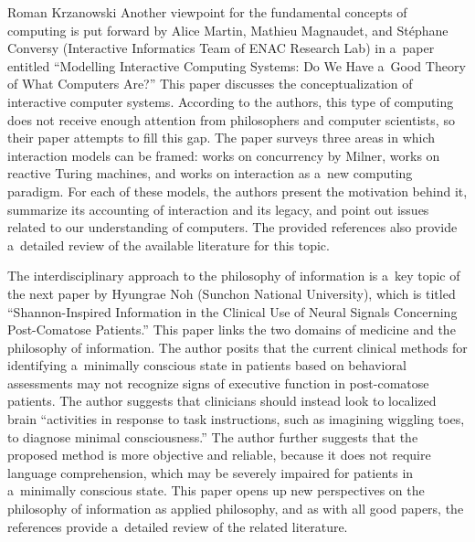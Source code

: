 \begin{editorialeng}{Roman Krzanowski}
Another viewpoint for the fundamental concepts of computing is put forward by Alice Martin, Mathieu Magnaudet, and Stéphane Conversy (Interactive Informatics Team of ENAC Research Lab) in a~paper entitled ``Modelling Interactive Computing Systems: Do We Have a~Good Theory of What Computers Are?'' This paper discusses the conceptualization of interactive computer systems. According to the authors, this type of computing does not receive enough attention from philosophers and computer scientists, so their paper attempts to fill this gap. The paper surveys three areas in which interaction models can be framed: works on concurrency by Milner, works on reactive Turing machines, and works on interaction as a~new computing paradigm. For each of these models, the authors present the motivation behind it, summarize its accounting of interaction and its legacy, and point out issues related to our understanding of computers. The provided references also provide a~detailed review of the available literature for this topic.

The interdisciplinary approach to the philosophy of information is a~key topic of the next paper by Hyungrae Noh (Sunchon National University), which is titled ``Shannon-Inspired Information in the Clinical Use of Neural Signals Concerning Post-Comatose Patients.'' This paper links the two domains of medicine and the philosophy of information. The author posits that the current clinical methods for identifying a~minimally conscious state in patients based on behavioral assessments may not recognize signs of executive function in post-comatose patients. The author suggests that clinicians should instead look to localized brain ``activities in response to task instructions, such as imagining wiggling toes, to diagnose minimal consciousness.'' The author further suggests that the proposed method is more objective and reliable, because it does not require language comprehension, which may be severely impaired for patients in a~minimally conscious state. This paper opens up new perspectives on the philosophy of information as applied philosophy, and as with all good papers, the references provide a~detailed review of the related literature.


\end{editorialeng}
